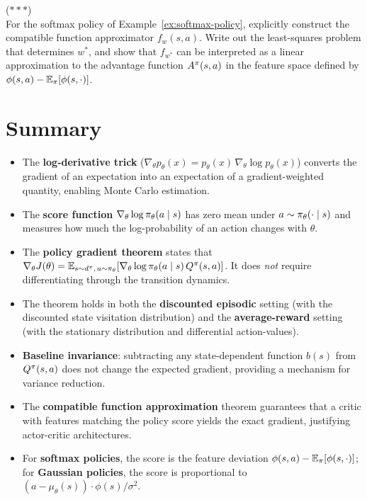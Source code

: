 \documentclass[11pt,a4paper]{article}
\begin{document}
\begin{exercise} \textnormal{(\(***\))} \\
  For the softmax policy of Example~\ref{ex:softmax-policy}, explicitly
  construct the compatible function approximator $f_w(s,a)$. Write out
  the least-squares problem that determines $w^*$, and show that
  $f_{w^*}$ can be interpreted as a linear approximation to the advantage
  function $A^{\pi}(s,a)$ in the feature space defined by
  $\phi(s,a) - \mathbb{E}_{\pi}[\phi(s,\cdot)]$.
\end{exercise}

\section{Summary}

\begin{itemize}
  \item The \textbf{log-derivative trick}
    ($\nabla_\theta p_\theta(x) = p_\theta(x)\, \nabla_\theta \log p_\theta(x)$)
    converts the gradient of an expectation into an expectation of a
    gradient-weighted quantity, enabling Monte Carlo estimation.

  \item The \textbf{score function} $\nabla_\theta \log \pi_\theta(a \mid s)$
    has zero mean under $a \sim \pi_\theta(\cdot \mid s)$ and measures
    how much the log-probability of an action changes with $\theta$.

  \item The \textbf{policy gradient theorem} states that
    $\nabla_\theta J(\theta) = \mathbb{E}_{s \sim d^{\pi},\, a \sim \pi_\theta}
    [\nabla_\theta \log \pi_\theta(a \mid s)\, Q^{\pi}(s,a)]$.
    It does \emph{not} require differentiating through the transition
    dynamics.

  \item The theorem holds in both the \textbf{discounted episodic}
    setting (with the discounted state visitation distribution) and the
    \textbf{average-reward} setting (with the stationary distribution and
    differential action-values).

  \item \textbf{Baseline invariance}: subtracting any state-dependent
    function $b(s)$ from $Q^{\pi}(s,a)$ does not change the expected gradient,
    providing a mechanism for variance reduction.

  \item The \textbf{compatible function approximation} theorem guarantees
    that a critic with features matching the policy score yields the exact
    gradient, justifying actor-critic architectures.

  \item For \textbf{softmax policies}, the score is the feature deviation
    $\phi(s,a) - \mathbb{E}_\pi[\phi(s,\cdot)]$; for \textbf{Gaussian policies},
    the score is proportional to $(a - \mu_\theta(s)) \cdot \phi(s) / \sigma^2$.
\end{itemize}
\end{document}
